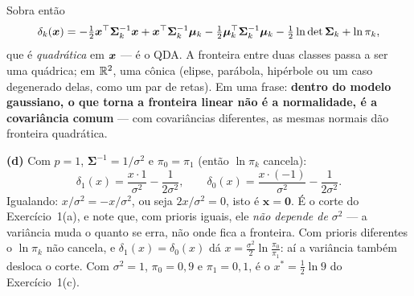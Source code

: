 \documentclass[11pt,a4paper]{article}
\begin{document}
\begin{solucao}
Sobra então
\[
  \delta_k(\bm{x}) = -\tfrac12\bm{x}^\top\bm\Sigma_k^{-1}\bm{x}
    + \bm{x}^\top\bm\Sigma_k^{-1}\bm\mu_k
    - \tfrac12\bm\mu_k^\top\bm\Sigma_k^{-1}\bm\mu_k
    - \tfrac12\ln\det\bm\Sigma_k + \ln\pi_k ,
\]
que é \emph{quadrática} em $\bm{x}$ --- é o QDA. A fronteira entre duas classes passa a
ser uma quádrica; em $\mathbb{R}^2$, uma cônica (elipse, parábola, hipérbole ou um caso
degenerado delas, como um par de retas). Em uma frase: \textbf{dentro do modelo
gaussiano, o que torna a fronteira linear não é a normalidade, é a covariância
comum} --- com covariâncias diferentes, as mesmas normais dão fronteira quadrática.

\smallskip
\textbf{(d)} Com $p=1$, $\bm\Sigma^{-1}=1/\sigma^2$ e $\pi_0=\pi_1$ (então
$\ln\pi_k$ cancela):
\[
  \delta_1(x)=\frac{x\cdot 1}{\sigma^2}-\frac{1}{2\sigma^2},
  \qquad
  \delta_0(x)=\frac{x\cdot(-1)}{\sigma^2}-\frac{1}{2\sigma^2}.
\]
Igualando: $x/\sigma^2 = -x/\sigma^2$, ou seja $2x/\sigma^2=0$, isto é
$\mathbf{x=0}$. É o corte do Exercício~1(a), e note que, com prioris iguais, ele
\emph{não depende de $\sigma^2$} --- a variância muda o quanto se erra, não onde fica
a fronteira. Com prioris diferentes o $\ln\pi_k$ não cancela, e
$\delta_1(x)=\delta_0(x)$ dá $x=\tfrac{\sigma^2}{2}\ln\frac{\pi_0}{\pi_1}$: aí a
variância também desloca o corte. Com $\sigma^2=1$, $\pi_0=0{,}9$ e $\pi_1=0{,}1$, é
o $x^\ast=\tfrac12\ln 9$ do Exercício~1(c).
\end{solucao}
\end{document}
